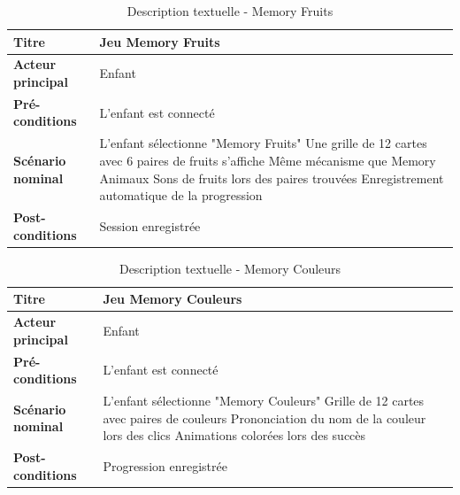 \documentclass[12pt,a4paper]{report}
\begin{document}
\begin{table}[H]
\centering
\begin{tabular}{|p{4cm}|p{10cm}|}
\hline
\textbf{Titre} & Jeu Memory Fruits \\
\hline
\textbf{Acteur principal} & Enfant \\
\hline
\textbf{Pré-conditions} & L'enfant est connecté \\
\hline
\textbf{Scénario nominal} & 
L'enfant sélectionne "Memory Fruits" \newline
Une grille de 12 cartes avec 6 paires de fruits s'affiche \newline
Même mécanisme que Memory Animaux \newline
Sons de fruits lors des paires trouvées \newline
Enregistrement automatique de la progression \\
\hline
\textbf{Post-conditions} & Session enregistrée \\
\hline
\end{tabular}
\caption{Description textuelle - Memory Fruits}
\end{table}

\begin{table}[H]
\centering
\begin{tabular}{|p{4cm}|p{10cm}|}
\hline
\textbf{Titre} & Jeu Memory Couleurs \\
\hline
\textbf{Acteur principal} & Enfant \\
\hline
\textbf{Pré-conditions} & L'enfant est connecté \\
\hline
\textbf{Scénario nominal} & 
L'enfant sélectionne "Memory Couleurs" \newline
Grille de 12 cartes avec paires de couleurs \newline
Prononciation du nom de la couleur lors des clics \newline
Animations colorées lors des succès \\
\hline
\textbf{Post-conditions} & Progression enregistrée \\
\hline
\end{tabular}
\caption{Description textuelle - Memory Couleurs}
\end{table}

\end{document}
